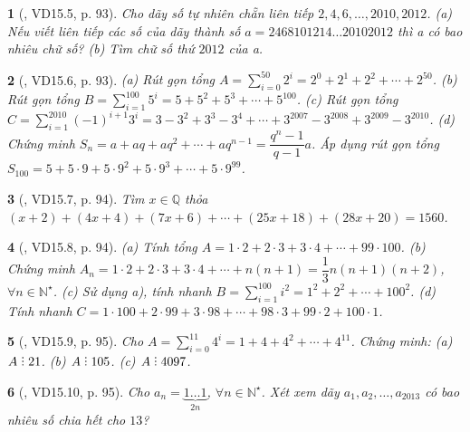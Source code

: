 \documentclass{article}
\newtheorem{baitoan}{}
\DeclareRobustCommand{\divby}{%
	\mathrel{\vbox{\baselineskip.65ex\lineskiplimit0pt\hbox{.}\hbox{.}\hbox{.}}}%
}
\begin{document}
\begin{baitoan}[\cite{TLCT_THCS_Toan_6_so_hoc}, VD15.5, p. 93]
	Cho dãy số tự nhiên chẵn liên tiếp $2,4,6,\ldots,2010,2012$. (a) Nếu viết liên tiếp các số của dãy thành số $a = 2468101214\ldots20102012$ thì a có bao nhiêu chữ số? (b) Tìm chữ số thứ $2012$ của a.
\end{baitoan}

\begin{baitoan}[\cite{TLCT_THCS_Toan_6_so_hoc}, VD15.6, p. 93]
	(a) Rút gọn tổng $A = \sum_{i=0}^{50} 2^i = 2^0 + 2^1 + 2^2 + \cdots + 2^{50}$. (b) Rút gọn tổng $B = \sum_{i=1}^{100} 5^i = 5 + 5^2 + 5^3 + \cdots + 5^{100}$. (c) Rút gọn tổng $C = \sum_{i=1}^{2010} (-1)^{i+1}3^i = 3 - 3^2 + 3^3 - 3^4 + \cdots + 3^{2007} - 3^{2008} + 3^{2009} - 3^{2010}$. (d) Chứng minh $S_n =  a + aq+ aq^2 + \cdots + aq^{n-1} = \dfrac{q^n - 1}{q - 1}a$. Áp dụng rút gọn tổng $S_{100} = 5 + 5\cdot9 + 5\cdot9^2 + 5\cdot9^3 + \cdots + 5\cdot9^{99}$.
\end{baitoan}

\begin{baitoan}[\cite{TLCT_THCS_Toan_6_so_hoc}, VD15.7, p. 94]
	Tìm $x\in\mathbb{Q}$ thỏa $(x + 2) + (4x + 4) + (7x + 6) + \cdots + (25x + 18) + (28x + 20) = 1560$.
\end{baitoan}

\begin{baitoan}[\cite{TLCT_THCS_Toan_6_so_hoc}, VD15.8, p. 94]
	(a) Tính tổng $A = 1\cdot2 + 2\cdot3 + 3\cdot4 + \cdots + 99\cdot100$. (b) Chứng minh $A_n = 1\cdot2 + 2\cdot3 + 3\cdot4 + \cdots + n(n + 1) = \dfrac{1}{3}n(n + 1)(n + 2)$, $\forall n\in\mathbb{N}^\star$. (c) Sử dụng a), tính nhanh $B = \sum_{i=1}^{100} i^2 = 1^2 + 2^2 + \cdots + 100^2$. (d) Tính nhanh $C = 1\cdot100 + 2\cdot99 + 3\cdot98 + \cdots + 98\cdot3 + 99\cdot2 + 100\cdot1$.
\end{baitoan}

\begin{baitoan}[\cite{TLCT_THCS_Toan_6_so_hoc}, VD15.9, p. 95]
	Cho $A = \sum_{i=0}^{11} 4^i = 1 + 4 + 4^2 + \cdots + 4^{11}$. Chứng minh: (a) $A\divby21$. (b) $A\divby105$. (c) $A\divby4097$.
\end{baitoan}

\begin{baitoan}[\cite{TLCT_THCS_Toan_6_so_hoc}, VD15.10, p. 95]
	Cho $a_n = \underbrace{1\ldots1}_{2n}$, $\forall n\in\mathbb{N}^\star$. Xét xem dãy $a_1,a_2,\ldots,a_{2013}$ có bao nhiêu số chia hết cho $13$?
\end{baitoan}
\end{document}
